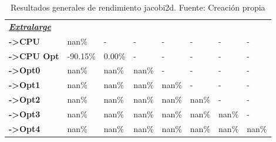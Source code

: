\begin{table}[H]
\begin{tabular}{llllllll}
    \cellcolor[HTML]{DAE8FC} \textbf{\textbf{{\emph{{\underline{{Extralarge}}}}}}} &  &  &  &  &  &  &  \\
    \rowcolor[HTML]{EFEFEF} \cellcolor[HTML]{DAE8FC} \textbf{->CPU} & nan\% & - & - & - & - & - & - \\
    \cellcolor[HTML]{DAE8FC} \textbf{->CPU Opt} & -90.15\% & 0.00\% & - & - & - & - & - \\
    \rowcolor[HTML]{EFEFEF} \cellcolor[HTML]{DAE8FC} \textbf{->Opt0} & nan\% & nan\% & nan\% & - & - & - & - \\
    \cellcolor[HTML]{DAE8FC} \textbf{->Opt1} & nan\% & nan\% & nan\% & nan\% & - & - & - \\
    \rowcolor[HTML]{EFEFEF} \cellcolor[HTML]{DAE8FC} \textbf{->Opt2} & nan\% & nan\% & nan\% & nan\% & nan\% & - & - \\
    \cellcolor[HTML]{DAE8FC} \textbf{->Opt3} & nan\% & nan\% & nan\% & nan\% & nan\% & 	nan\% & - \\
    \rowcolor[HTML]{EFEFEF} \cellcolor[HTML]{DAE8FC} \textbf{->Opt4} & nan\% & nan\% & nan\% & nan\% & nan\% & 	nan\% & 	nan\% \\
    \end{tabular}
    \caption[Resultados generales de rendimiento jacobi2d]{{Resultados generales de rendimiento jacobi2d. Fuente: Creación propia}}
    \label{table_global_jacobi2d_PerformanceResults_speedup}
\end{table}